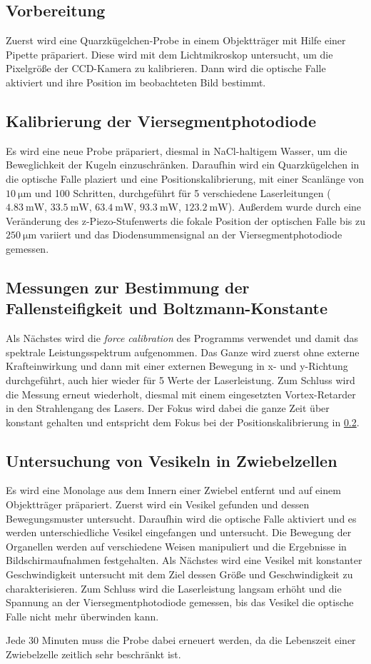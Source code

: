   \subsection{Vorbereitung}
    Zuerst wird eine Quarzkügelchen-Probe in einem Objektträger mit Hilfe einer Pipette präpariert. Diese wird mit dem Lichtmikroskop untersucht, um die Pixelgröße der CCD-Kamera zu kalibrieren. Dann wird die optische Falle aktiviert und ihre Position im beobachteten Bild bestimmt.
  \subsection{Kalibrierung der Viersegmentphotodiode}
  \label{sec:Kalib}
    Es wird eine neue Probe präpariert, diesmal in NaCl-haltigem Wasser, um die Beweglichkeit der Kugeln einzuschränken. Daraufhin wird ein Quarzkügelchen in die optische Falle plaziert und eine Positionskalibrierung, mit einer Scanlänge von $\SI{10}{\micro\metre}$ und 100 Schritten, durchgeführt für 5 verschiedene Laserleitungen ($\SI{4.83}{\milli\watt}$, $\SI{33.5}{\milli\watt}$, $\SI{63.4}{\milli\watt}$, $\SI{93.3}{\milli\watt}$, $\SI{123.2}{\milli\watt}$).
    Außerdem wurde durch eine Veränderung des z-Piezo-Stufenwerts die fokale Position der optischen Falle bis zu $\SI{250}{\micro\metre}$ variiert und das Diodensummensignal an der Viersegmentphotodiode gemessen.
  \subsection{Messungen zur Bestimmung der Fallensteifigkeit und Boltzmann-Konstante}
    Als Nächstes wird die \textit{force calibration} des Programms verwendet und damit das spektrale Leistungsspektrum aufgenommen. Das Ganze wird zuerst ohne externe Krafteinwirkung und dann mit einer externen Bewegung in x- und y-Richtung durchgeführt, auch hier wieder für 5 Werte der Laserleistung. Zum Schluss wird die Messung erneut wiederholt, diesmal mit einem eingesetzten Vortex-Retarder in den Strahlengang des Lasers.
    Der Fokus wird dabei die ganze Zeit über konstant gehalten und entspricht dem Fokus bei der Positionskalibrierung in \ref{sec:Kalib}.
  \subsection{Untersuchung von Vesikeln in Zwiebelzellen}
    Es wird eine Monolage aus dem Innern einer Zwiebel entfernt und auf einem Objektträger präpariert.
    Zuerst wird ein Vesikel gefunden und dessen Bewegungsmuster untersucht. Daraufhin wird die optische Falle aktiviert und es werden unterschiedliche Vesikel eingefangen und untersucht. Die Bewegung der Organellen werden auf verschiedene Weisen manipuliert und die Ergebnisse in Bildschirmaufnahmen festgehalten.
    Als Nächstes wird eine Vesikel mit konstanter Geschwindigkeit untersucht mit dem Ziel dessen Größe und Geschwindigkeit zu charakterisieren.
    Zum Schluss wird die Laserleistung langsam erhöht und die Spannung an der Viersegmentphotodiode gemessen, bis das Vesikel die optische Falle nicht mehr überwinden kann.
    
    Jede 30 Minuten muss die Probe dabei erneuert werden, da die Lebenszeit einer Zwiebelzelle zeitlich sehr beschränkt ist.